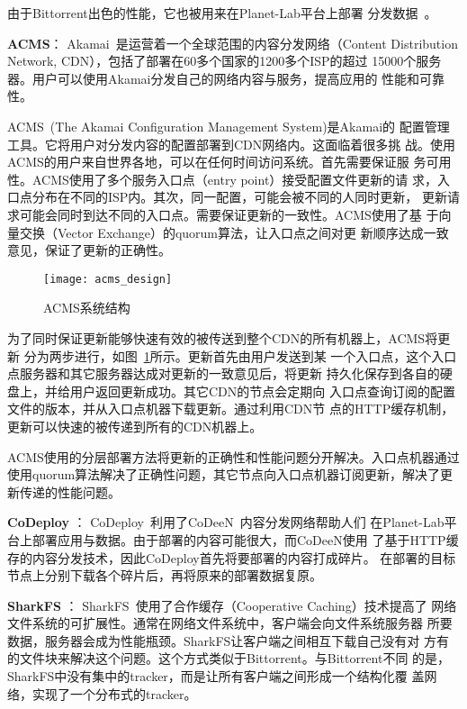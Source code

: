 由于Bittorrent出色的性能，它也被用来在Planet-Lab平台上部署
分发数据~\cite{plDist}。

\textbf{ACMS}：
Akamai~\cite{akamai}是运营着一个全球范围的内容分发网络（Content
Distribution Network, CDN），包括了部署在60多个国家的1200多个ISP的超过
15000个服务器。用户可以使用Akamai分发自己的网络内容与服务，提高应用的
性能和可靠性。

ACMS~\cite{acms}(The Akamai Configuration Management System)是Akamai的
配置管理工具。它将用户对分发内容的配置部署到CDN网络内。这面临着很多挑
战。使用ACMS的用户来自世界各地，可以在任何时间访问系统。首先需要保证服
务可用性。ACMS使用了多个服务入口点（entry point）接受配置文件更新的请
求，入口点分布在不同的ISP内。其次，同一配置，可能会被不同的人同时更新，
更新请求可能会同时到达不同的入口点。需要保证更新的一致性。ACMS使用了基
于向量交换（Vector Exchange）的quorum算法，让入口点之间对更
新顺序达成一致意见，保证了更新的正确性。

\begin{figure}
\centering
\texttt{[image: acms\_design]}
\caption{ACMS系统结构}
\label{fig:acms_design}
\end{figure}


为了同时保证更新能够快速有效的被传送到整个CDN的所有机器上，ACMS将更新
分为两步进行，如图~\ref{fig:acms_design}所示。更新首先由用户发送到某
一个入口点，这个入口点服务器和其它服务器达成对更新的一致意见后，将更新
持久化保存到各自的硬盘上，并给用户返回更新成功。其它CDN的节点会定期向
入口点查询订阅的配置文件的版本，并从入口点机器下载更新。通过利用CDN节
点的HTTP缓存机制，更新可以快速的被传递到所有的CDN机器上。

ACMS使用的分层部署方法将更新的正确性和性能问题分开解决。入口点机器通过
使用quorum算法解决了正确性问题，其它节点向入口点机器订阅更新，解决了更
新传递的性能问题。

\textbf{CoDeploy} ：
CoDeploy~\cite{codeploy}利用了CoDeeN~\cite{codeen}内容分发网络帮助人们
在Planet-Lab平台上部署应用与数据。由于部署的内容可能很大，而CoDeeN使用
了基于HTTP缓存的内容分发技术，因此CoDeploy首先将要部署的内容打成碎片。
在部署的目标节点上分别下载各个碎片后，再将原来的部署数据复原。

\textbf{SharkFS} ：
SharkFS~\cite{sharkfs}使用了合作缓存（Cooperative Caching）技术提高了
网络文件系统的可扩展性。通常在网络文件系统中，客户端会向文件系统服务器
所要数据，服务器会成为性能瓶颈。SharkFS让客户端之间相互下载自己没有对
方有的文件块来解决这个问题。这个方式类似于Bittorrent。与Bittorrent不同
的是，SharkFS中没有集中的tracker，而是让所有客户端之间形成一个结构化覆
盖网络\cite{coral}，实现了一个分布式的tracker。

